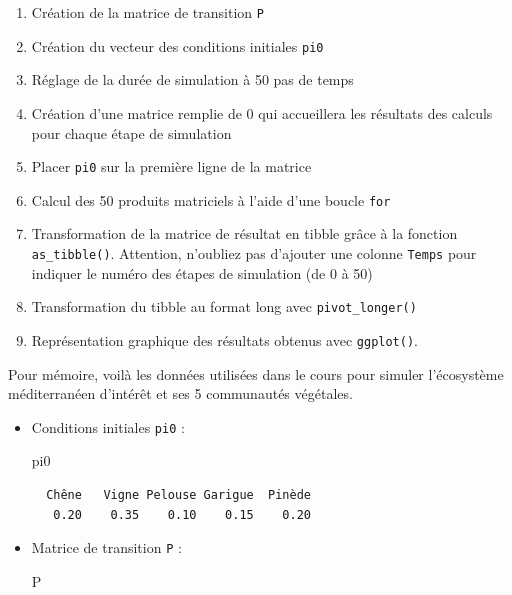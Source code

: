 \documentclass[
  french,
  a4paper,
  DIV=11,
  numbers=noendperiod,
  oneside]{scrreprt}
\newenvironment{Shaded}{}{}
\newcommand{\NormalTok}[1]{\textcolor[rgb]{0.14,0.16,0.18}{#1}}
\providecommand{\tightlist}{%
  \setlength{\itemsep}{0pt}\setlength{\parskip}{0pt}}
\begin{document}
\begin{tcolorbox}
\begin{enumerate}
\def\labelenumi{\arabic{enumi}.}
\tightlist
\item
  Création de la matrice de transition \texttt{P}
\item
  Création du vecteur des conditions initiales \texttt{pi0}
\item
  Réglage de la durée de simulation à 50 pas de temps
\item
  Création d'une matrice remplie de 0 qui accueillera les résultats des
  calculs pour chaque étape de simulation
\item
  Placer \texttt{pi0} sur la première ligne de la matrice
\item
  Calcul des 50 produits matriciels à l'aide d'une boucle \texttt{for}
\item
  Transformation de la matrice de résultat en tibble grâce à la fonction
  \texttt{as\_tibble()}. Attention, n'oubliez pas d'ajouter une colonne
  \texttt{Temps} pour indiquer le numéro des étapes de simulation (de 0
  à 50)
\item
  Transformation du tibble au format long avec \texttt{pivot\_longer()}
\item
  Représentation graphique des résultats obtenus avec \texttt{ggplot()}.
\end{enumerate}

Pour mémoire, voilà les données utilisées dans le cours pour simuler
l'écosystème méditerranéen d'intérêt et ses 5 communautés végétales.

\begin{itemize}
\item
  Conditions initiales \texttt{pi0} :

\begin{Shaded}
\begin{Highlighting}[]
\NormalTok{pi0}
\end{Highlighting}
\end{Shaded}

\begin{verbatim}
  Chêne   Vigne Pelouse Garigue  Pinède 
   0.20    0.35    0.10    0.15    0.20 
\end{verbatim}
\item
  Matrice de transition \texttt{P} :

\begin{Shaded}
\begin{Highlighting}[]
\NormalTok{P}
\end{Highlighting}
\end{Shaded}


\end{itemize}
\end{tcolorbox}
\end{document}
